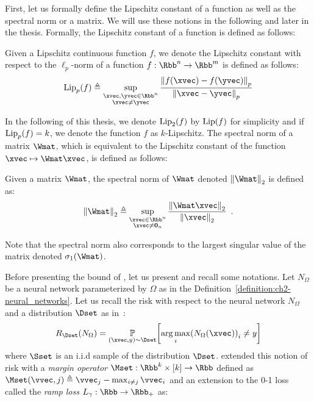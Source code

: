 First, let us formally define the Lipschitz constant of a function as well as the spectral norm or a matrix.
We will use these notions in the following and later in the thesis.
Formally, the Lipschitz constant of a function is defined as follows: 
\begin{definition} \label{definition:ch2-lipschitz_constant}
  Given a Lipschitz continuous function $f$, we denote the Lipschitz constant with respect to the $\ell_p$-norm of a function $f: \Rbb^n \rightarrow \Rbb^m$ is defined as follows:
  \begin{equation}
  \lipp{p}{f} \triangleq \sup_{\substack{\xvec, \yvec \in \Rbb^n \\ \xvec \neq \yvec}} \frac{\norm{f(\xvec) - f(\yvec)}_p}{\norm{\xvec - \yvec}_p}
  \end{equation}
  \removespace
\end{definition}
\noindent
In the following of this thesis, we denote $\lipp{2}{f}$ by $\lip{f}$ for simplicity and if $\lipp{p}{f}=k$, we denote the function $f$ as $k$-Lipschitz.
The spectral norm of a matrix $\Wmat$, which is equivalent to the Lipschitz constant of the function $\xvec \mapsto \Wmat \xvec$, is defined as follows:
\begin{definition} \label{defintion:ch2-spectral_norm}
Given a matrix $\Wmat$, the spectral norm of $\Wmat$ denoted $\norm{\Wmat}_2$ is defined as:
  \begin{equation}
    \norm{\Wmat}_2 \triangleq \sup_{\substack{\xvec \in \Rbb^n \\ \xvec \neq \zerovec{n}}} \frac{\norm{\Wmat \xvec}_2}{\norm{\xvec}_2} \enspace.
  \end{equation}
  \removespace
\end{definition}
\noindent
Note that the spectral norm also corresponds to the largest singular value of the matrix denoted $\sigma_1(\Wmat)$.

Before presenting the bound of \citet{bartlett2017spectrally}, let us present and recall some notations.
Let $N_\Omega$ be a neural network parameterized by $\Omega$ as in the Definition~\ref{definition:ch2-neural_networks}.
Let us recall the risk with respect to the neural network $N_\Omega$ and a distribution $\Dset$ as in~:
\begin{equation}
  R_\Dset(N_\Omega) = \Pbb_{(\xvec, y) \sim \Dset} \left[ \argmax_i \left( N_\Omega(\xvec) \right)_i \neq y \right]
\end{equation}
where $\Sset$ is an i.i.d sample of the distribution $\Dset$.
\citet{bartlett2017spectrally} extended this notion of risk with a \emph{margin operator} $\Mset: \Rbb^k \times [k] \rightarrow \Rbb$ defined as $\Mset(\vvec, j) \triangleq \vvec_j - \max_{i \neq j} \vvec_i$ and an extension to the 0-1 loss called the \emph{ramp loss} $L_\gamma: \Rbb \rightarrow \Rbb_+$ as:

